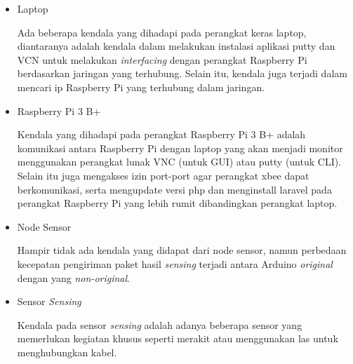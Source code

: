    \begin{itemize}
       \item Laptop
       
       Ada beberapa kendala yang dihadapi pada perangkat keras laptop, diantaranya adalah kendala dalam melakukan instalasi aplikasi putty dan VCN untuk melakukan \textit{interfacing} dengan perangkat Raspberry Pi berdasarkan jaringan yang terhubung. Selain itu, kendala juga terjadi dalam mencari ip Raspberry Pi yang terhubung dalam jaringan.
       
       \item Raspberry Pi 3 B+
       
       Kendala yang dihadapi pada perangkat Raspberry Pi 3 B+ adalah komunikasi antara Raspberry Pi dengan laptop yang akan menjadi monitor menggunakan perangkat lunak VNC (untuk GUI) atau putty (untuk CLI). Selain itu juga mengakses izin port-port agar perangkat xbee dapat berkomunikasi, serta mengupdate versi php dan menginstall laravel pada perangkat Raspberry Pi yang lebih rumit dibandingkan perangkat laptop. 
       
       
       \item Node Sensor
       
       Hampir tidak ada kendala yang didapat dari node sensor, namun perbedaan kecepatan pengiriman paket hasil \textit{sensing} terjadi antara Arduino \textit{original} dengan yang \textit{non-original}.
       
       \item Sensor \textit{Sensing}
       
       Kendala pada sensor \textit{sensing} adalah adanya beberapa sensor yang memerlukan kegiatan khusus seperti merakit atau menggunakan las untuk menghubungkan kabel.
   \end{itemize}